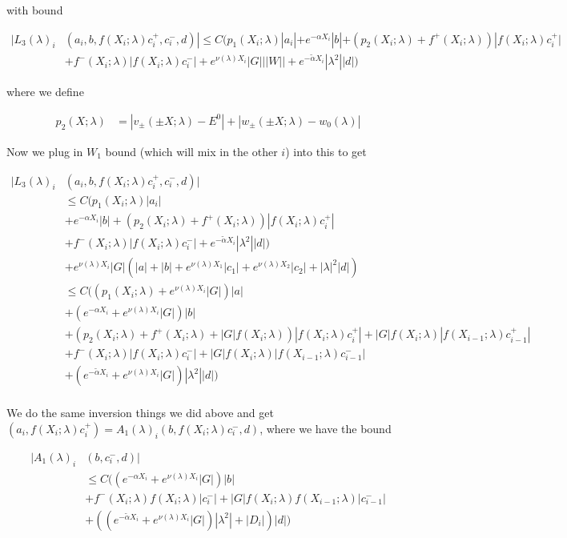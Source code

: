 \documentclass[12pt]{article}
\begin{document}
\begin{enumerate}
with bound 

\begin{align*}
|L_3(\lambda)_i&(a_i, b, f(X_i; \lambda) c_i^+, c_i^-, d)| \leq C ( p_1(X_i; \lambda)|a_i|
+ e^{-\alpha X_i}|b| + ( p_2(X_i; \lambda) + f^+(X_i; \lambda)) |f(X_i; \lambda) c_i^+| \\
&+f^-(X_i; \lambda)|f(X_i; \lambda) c_i^-| + e^{\nu(\lambda)X_i} |G| ||W|| + e^{-\tilde{\alpha} X_i} |\lambda^2| |d| )
\end{align*}

where we define

\begin{align*}
p_2(X; \lambda) &= |v_\pm(\pm X; \lambda) - E^0| + |w_\pm(\pm X; \lambda) - w_0(\lambda)|
\end{align*}

Now we plug in $W_1$ bound (which will mix in the other $i$) into this to get

\begin{align*}
|L_3(\lambda)_i&(a_i, b, f(X_i; \lambda) c_i^+, c_i^-, d)| \\
&\leq C ( p_1(X_i; \lambda)|a_i| \\
&+ e^{-\alpha X_i}|b| + ( p_2(X_i; \lambda) + f^+(X_i; \lambda)) |f(X_i; \lambda) c_i^+| \\
&+f^-(X_i; \lambda)|f(X_i; \lambda) c_i^-| + e^{-\tilde{\alpha} X_i} |\lambda^2| |d| ) \\
&+ e^{\nu(\lambda)X_i} |G| (|a| + |b| + e^{\nu(\lambda)X_1}|c_1| + e^{\nu(\lambda)X_2}|c_2| + |\lambda|^2 |d| )\\
&\leq C ( ( p_1(X_i; \lambda) + e^{\nu(\lambda)X_i} |G| )|a| \\
&+ (e^{-\alpha X_i} + e^{\nu(\lambda)X_i} |G| )|b| \\
&+ ( p_2(X_i; \lambda) + f^+(X_i; \lambda) + |G|f(X_i; \lambda)) |f(X_i; \lambda) c_i^+| + |G|f(X_i; \lambda)|f(X_{i-1}; \lambda) c_{i-1}^+| \\
&+ f^-(X_i; \lambda)|f(X_i; \lambda) c_i^-|  + |G| f(X_i; \lambda) |f(X_{i-1}; \lambda) c_{i-1}^-| \\
&+ (e^{-\tilde{\alpha} X_i} + e^{\nu(\lambda)X_i} |G| ) |\lambda^2| |d| ) \\
\end{align*}

We do the same inversion things we did above and get $(a_i, f(X_i; \lambda) c_i^+) = A_1(\lambda)_i(b, f(X_i; \lambda) c_i^-, d)$, where we have the bound

\begin{align*}
|A_1(\lambda)_i&(b, c_i^-, d)| \\
&\leq C ( (e^{-\alpha X_i} + e^{\nu(\lambda)X_i} |G| )|b| \\
&+ f^-(X_i; \lambda)f(X_i; \lambda) |c_i^-|  + |G| f(X_i; \lambda) f(X_{i-1}; \lambda) |c_{i-1}^-| \\
&+ ((e^{-\tilde{\alpha} X_i} + e^{\nu(\lambda)X_i} |G| ) |\lambda^2| + |D_i|) |d| ) \\
\end{align*}


\end{enumerate}
\end{document}
